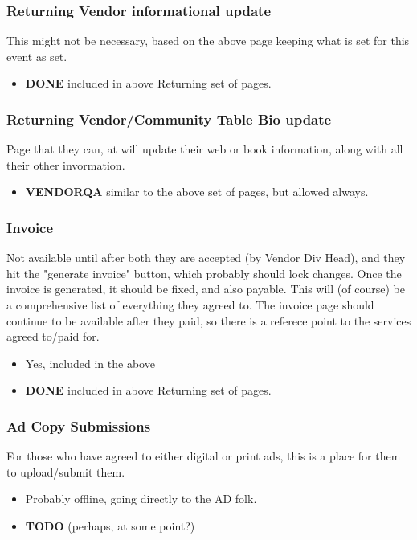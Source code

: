 \documentclass[captions=tablesignature]{scrartcl}
\begin{document}
\subsubsection{Returning Vendor informational update}
\label{sec-3-1-6}
This might not be necessary, based on the above page keeping what
is set for this event as set.
\begin{itemize}
\item {\bfseries\sffamily DONE} included in above Returning set of pages.
\label{sec-3-1-6-1}
\end{itemize}

\subsubsection{Returning Vendor/Community Table Bio update}
\label{sec-3-1-7}
Page that they can, at will update their web or book information,
along with all their other invormation.
\begin{itemize}
\item {\bfseries\sffamily VENDORQA} similar to the above set of pages, but allowed always.
\label{sec-3-1-7-1}
\end{itemize}

\subsubsection{Invoice}
\label{sec-3-1-8}
Not available until after both they are accepted (by Vendor
Div Head), and they hit the "generate invoice" button, which
probably should lock changes.  Once the invoice is generated, it
should be fixed, and also payable.
This will (of course) be a comprehensive list of everything they
agreed to.  The invoice page should continue to be available after
they paid, so there is a referece point to the services agreed
to/paid for.
\begin{itemize}
\item Yes, included in the above
\end{itemize}
\begin{itemize}
\item {\bfseries\sffamily DONE} included in above Returning set of pages.
\label{sec-3-1-8-1}
\end{itemize}

\subsubsection{Ad Copy Submissions}
\label{sec-3-1-9}
For those who have agreed to either digital or print ads, this is
a place for them to upload/submit them.
\begin{itemize}
\item Probably offline, going directly to the AD folk.
\end{itemize}
\begin{itemize}
\item {\bfseries\sffamily TODO} (perhaps, at some point?)
\label{sec-3-1-9-1}
\end{itemize}
\end{document}
